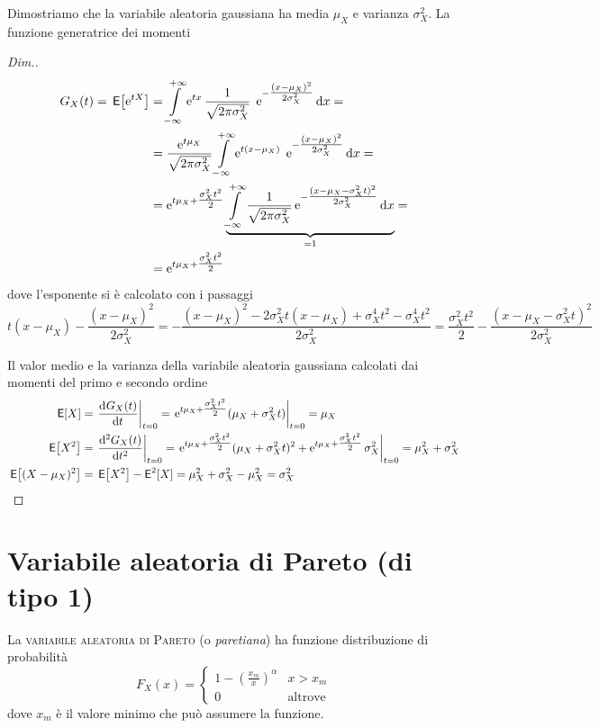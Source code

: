 Dimostriamo che la variabile aleatoria gaussiana ha media $\mu_X$ e varianza $\sigma^2_X$. La funzione generatrice dei momenti
\begin{proof}[Dim.]
\[
	\begin{split}G_X(t)=\,{\operatorname{\mathsf{E}}}\!\left[{\operatorname{e}^{t X}}\right]&=\int\limits_{-\infty}^{+\infty}{\operatorname{e}^{t x}\frac{1}{\sqrt{2\pi\sigma^2_X}}\;\operatorname{e}^{-\tfrac{(x-\mu_X)^2}{2\sigma^2_X}}}{\,\mathop{}\!\mathrm{d}{x}}=\\
	&=\frac{\operatorname{e}^{t\mu_X}}{\sqrt{2\pi\sigma^2_X}}\int\limits_{-\infty}^{+\infty}{\operatorname{e}^{t (x-\mu_X)}\;\operatorname{e}^{-\tfrac{(x-\mu_X)^2}{2\sigma^2_X}}}{\,\mathop{}\!\mathrm{d}{x}}=\\
	&=\operatorname{e}^{t\mu_X+\tfrac{\sigma^2_X t^2}{2}}\underbrace{\int\limits_{-\infty}^{+\infty}{\frac{1}{\sqrt{2\pi\sigma^2_X}}\operatorname{e}^{-\tfrac{(x-\mu_X-\sigma^2_X t)^2}{2\sigma^2_X}}}{\,\mathop{}\!\mathrm{d}{x}}}_{=1}=\\
	&=\operatorname{e}^{t\mu_X+\tfrac{\sigma^2_X t^2}{2}}\end{split}
\]
dove l'esponente si è calcolato con i passaggi
\[
	t(x-\mu_X)-\frac{(x-\mu_X)^2}{2\sigma^2_X}=-\frac{(x-\mu_X)^2-2\sigma^2_X t(x-\mu_X)+\sigma^4_X t^2-\sigma^4_X t^2}{2\sigma^2_X}=\frac{\sigma^2_X t^2}{2}-\frac{(x-\mu_X-\sigma^2_X t)^2}{2\sigma^2_X}
\]

Il valor medio e la varianza della variabile aleatoria gaussiana calcolati dai momenti del primo e secondo ordine
\begin{equation}
\begin{split}
	\E{X}&=\restrict{\deriv{G_X(t)}{t}}{t=0}=\restrict{\e{t\mu_X+\tfrac{\sigma^2_X t^2}{2}}(\mu_X+\sigma^2_X t)}{t=0}=\mu_X
	\\
	\E{X^2}&=\restrict{\deriv[2]{G_X(t)}{t}}{t=0}=\restrict{\e{t\mu_X+\tfrac{\sigma^2_X t^2}{2}}(\mu_X+\sigma^2_X t)^2+\e{t\mu_X+\tfrac{\sigma^2_X t^2}{2}}\sigma^2_X}{t=0}=\mu^2_X+\sigma^2_X
	\\
	\E{(X-\mu_X)^2}&=\E{X^2}-\Esp^2[X]=\mu^2_X+\sigma^2_X-\mu^2_X=\sigma^2_X
\end{split}
\end{equation}
\end{proof}

\section{Variabile aleatoria di Pareto (di tipo 1)}
La \textsc{variabile aleatoria di Pareto} (o \emph{paretiana}) ha funzione distribuzione di probabilità
\begin{equation}
	F_X(x) =
	\begin{cases}
		1-\left(\frac{x_m}{x}\right)^\alpha & x>x_m\\
		0 & \text{altrove}
	\end{cases}
\end{equation}
dove $x_m$ è il valore minimo che può assumere la funzione.


